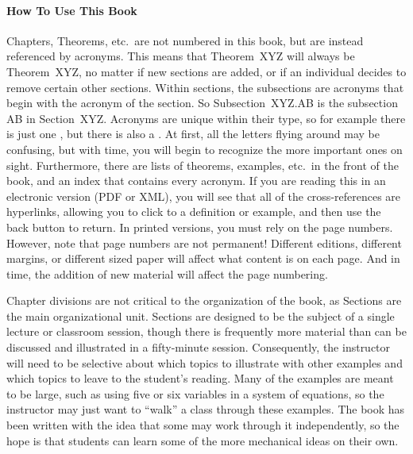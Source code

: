 \paragraph{How To Use This Book}
%
Chapters, Theorems, etc.\ are not numbered in this book, but are instead referenced by acronyms.  This means that Theorem~XYZ will always be Theorem~XYZ, no matter if new sections are added, or if an individual decides to remove certain other sections.  Within sections, the subsections are acronyms that begin with the acronym of the section.  So Subsection~XYZ.AB is the subsection AB in Section~XYZ.  Acronyms are unique within their type, so for example there is just one , but there is also a .  At first, all the letters flying around may be confusing, but with time, you will begin to recognize the more important ones on sight.  Furthermore, there are lists of theorems, examples, etc.\ in the front of the book, and an index that contains every acronym.  If you are reading this in an electronic version (PDF or XML), you will see that all of the cross-references are hyperlinks, allowing you to click to a definition or example, and then use the back button to return.  In printed versions, you must rely on the page numbers.  However, note that page numbers are not permanent!  Different editions, different margins, or different sized paper will affect what content is on each page.  And in time, the addition of new material will affect the page numbering.\par
%
Chapter divisions are not critical to the organization of the book, as Sections are the main organizational unit.  Sections are designed to be the subject of a single lecture or classroom session, though there is frequently more material than can be discussed and illustrated in a fifty-minute session.  Consequently, the instructor will need to be selective about which topics to illustrate with other examples and which topics to leave to the student's reading.  Many of the examples are meant to be large, such as using five or six variables in a system of equations, so the instructor may just want to ``walk'' a class through these examples.  The book has been written with the idea that some may work through it independently, so the hope is that students can learn some of the more mechanical ideas on their own.\par
%
